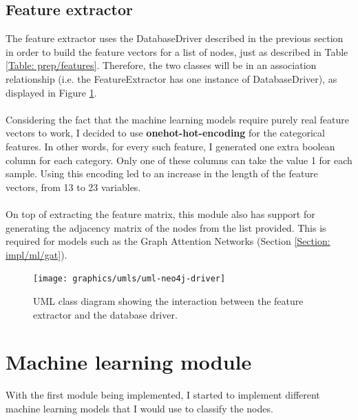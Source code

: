 	\subsection{Feature extractor} \label{Section: impl/neo4j/features}
	The feature extractor uses the DatabaseDriver described in the previous section in order to build the feature vectors for a list of nodes, just as described in Table \ref{Table: prep/features}. Therefore, the two classes will be in an association relationship (i.e. the FeatureExtractor has one instance of DatabaseDriver), as displayed in Figure \ref{Fig: impl/neo4j-driver-uml}.
	\\ \\
	Considering the fact that the machine learning models require purely real feature vectors to work, I decided to use \textbf{onehot-hot-encoding} for the categorical features. In other words, for every such feature, I generated one extra boolean column for each category. Only one of these columns can take the value 1 for each sample. Using this encoding led to an increase in the length of the feature vectors, from 13 to 23 variables. 
	\\ \\
	On top of extracting the feature matrix, this module also has support for generating the adjacency matrix of the nodes from the list provided. This is required for models such as the Graph Attention Networks (Section \ref{Section: impl/ml/gat}).
	\begin{figure}[H]
		\centering
		\texttt{[image: graphics/umls/uml-neo4j-driver]}
		\caption[FeatureExtractor UML class diagram]{\centering UML class diagram showing the interaction between the feature extractor and the database driver.}
		\label{Fig: impl/neo4j-driver-uml}
	\end{figure}
	\section{Machine learning module} \label{Section: impl/ml}
	With the first module being implemented, I started to implement different machine learning models that I would use to classify the nodes. 
